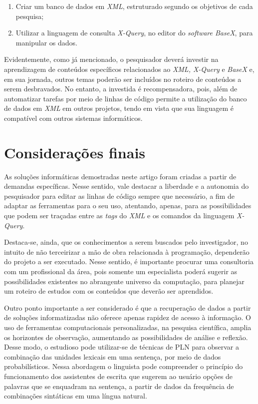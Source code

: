 \documentclass[portuguese]{textolivre}
\begin{document}
\begin{enumerate}[label=\roman*]
    \item Criar um banco de dados em \emph{XML}, estruturado segundo os objetivos de cada pesquisa; 
    \item Utilizar a linguagem de consulta \emph{X-Query}, no editor do \emph{software BaseX}, para manipular os dados.
\end{enumerate} 

Evidentemente, como já mencionado, o pesquisador deverá investir na aprendizagem de conteúdos específicos relacionados ao \emph{XML, X-Query} e \emph{BaseX} e, em sua jornada, outros temas poderão ser incluídos no roteiro de conteúdos a serem desbravados. No entanto, a investida é recompensadora, pois, além de automatizar tarefas por meio de linhas de código permite a utilização do banco de dados em \emph{XML} em outros projetos, tendo em vista que sua linguagem é compatível com outros sistemas informáticos.


\section{Considerações finais}
As soluções informáticas demostradas neste artigo foram criadas a partir de demandas específicas. Nesse sentido, vale destacar a liberdade e a autonomia do pesquisador para editar as linhas de código sempre que necessário, a fim de adaptar as ferramentas para o seu uso, atentando, apenas, para as possibilidades que podem ser traçadas entre as \emph{tags} do \emph{XML} e os comandos da linguagem \emph{X-Query}.

Destaca-se, ainda, que os conhecimentos a serem buscados pelo investigador, no intuito de não terceirizar a mão de obra relacionada à programação, dependerão do projeto a ser executado. Nesse sentido, é importante procurar uma consultoria com um profissional da área, pois somente um especialista poderá sugerir as possibilidades existentes no abrangente universo da computação, para planejar um roteiro de estudos com os conteúdos que deverão ser aprendidos. 

Outro ponto importante a ser considerado é que a recuperação de dados a partir de soluções informatizadas não oferece apenas rapidez de acesso à informação. O uso de ferramentas computacionais personalizadas, na pesquisa científica, amplia os horizontes de observação, aumentando as possibilidades de análise e reflexão. Desse modo, o estudioso pode utilizar-se de técnicas de PLN para observar a combinação das unidades lexicais em uma sentença, por meio de dados probabilísticos. Nessa abordagem o linguista pode compreender o princípio do funcionamento dos assistentes de escrita que sugerem ao usuário opções de palavras que se enquadram na sentença, a partir de dados da frequência de combinações sintáticas em uma língua natural. 
\end{document}
